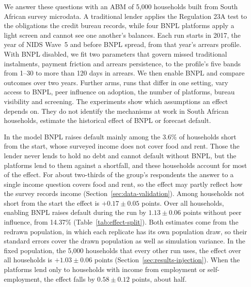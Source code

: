 We answer these questions with an \ac{ABM} of 5{,}000 households built from South African survey
microdata. A traditional lender applies the Regulation 23A test to the obligations the credit
bureau records, while four \ac{BNPL} platforms apply a light screen and cannot see one another's
balances. Each run starts in 2017, the year of \ac{NIDS} Wave~5 and before \ac{BNPL} spread, from
that year's arrears profile. With \ac{BNPL}
disabled, we fit two parameters that govern missed traditional instalments, payment friction and
arrears persistence, to the profile's five bands from 1--30 to more than 120 days in arrears. We
then enable \ac{BNPL} and compare outcomes over two years. Further arms, runs that differ in one
setting, vary access to \ac{BNPL}, peer influence on adoption, the number of platforms, bureau
visibility and screening. The experiments show which assumptions an effect depends on. They do not
identify the mechanisms at work in South African households, estimate the historical effect of
\ac{BNPL} or forecast default.

In the model \ac{BNPL} raises default mainly among the 3.6\% of households short from the start,
whose surveyed income does not cover food and rent. Those the lender never lends to hold no
debt and cannot default without \ac{BNPL}, but the platforms lend to them against a shortfall,
and these households account for most of the effect. For about two-thirds of the group's
respondents the answer to a single income question covers food and rent, so the effect may partly
reflect how the survey records income (Section~\ref{sec:data-validation}). Among households not
short from the start the effect is $+0.17 \pm 0.05$ points. Over all households, enabling
\ac{BNPL} raises default during the run by $1.13 \pm 0.06$ points without peer influence, from
14.37\% (Table~\ref{tab:effect-split}). Both estimates come from the redrawn population, in which
each replicate has its own population draw, so their standard errors cover the drawn population
as well as simulation variance. In the fixed population, the 5{,}000 households that every other
run uses, the effect over all households is $+1.03 \pm 0.06$ points
(Section~\ref{sec:results-injection}). When the platforms lend only to households with income
from employment or self-employment, the effect falls by $0.58 \pm 0.12$ points, about half.

